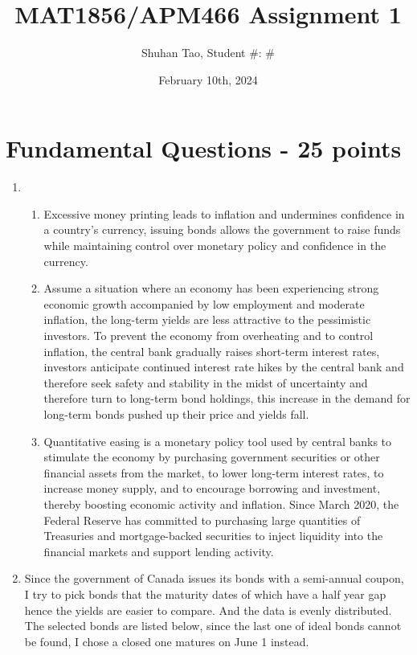 \documentclass{article}
\title{MAT1856/APM466 Assignment 1}
\author{Shuhan Tao, Student \#: #}
\date{February 10th, 2024}
\begin{document}
\maketitle

\section*{Fundamental Questions - 25 points}

\begin{enumerate}
    \item \hfill
    \begin{enumerate}
        \item Excessive money printing leads to inflation and undermines confidence in a country's currency, issuing bonds allows the government to raise funds while maintaining control over monetary policy and confidence in the currency.
        \item Assume a situation where an economy has been experiencing strong economic growth accompanied by low employment and moderate inflation, the long-term yields are less attractive to the pessimistic investors. To prevent the economy from overheating and to control inflation, the central bank gradually raises short-term interest rates, investors anticipate continued interest rate hikes by the central bank and therefore seek safety and stability in the midst of uncertainty and therefore turn to long-term bond holdings, this increase in the demand for long-term bonds pushed up their price and yields fall.
        \item Quantitative easing is a monetary policy tool used by central banks to stimulate the economy by purchasing government securities or other financial assets from the market, to lower long-term interest rates, to increase money supply, and to encourage borrowing and investment, thereby boosting economic activity and inflation. Since March 2020, the Federal Reserve has committed to purchasing large quantities of Treasuries and mortgage-backed securities to inject liquidity into the financial markets and support lending activity. 
    \end{enumerate}
    \item Since the government of Canada issues its bonds with a semi-annual coupon, I try to pick bonds that the maturity dates of which have a half year gap hence the yields are easier to compare. And the data is evenly distributed. The selected bonds are listed below, since the last one of ideal bonds cannot be found, I chose a closed one matures on June 1 instead.

\end{enumerate}
\end{document}
